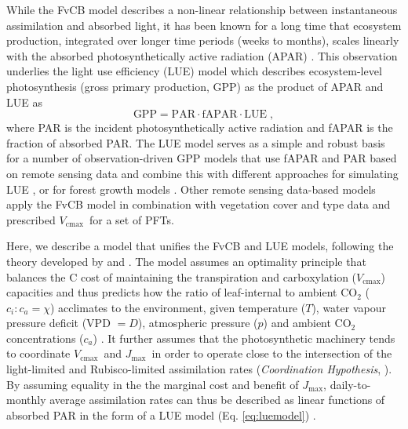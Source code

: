 \documentclass[gmd, manuscript]{copernicus}
\newcommand{\vcmax}{$V_{\text{cmax}}$}
\newcommand{\jmax}{$J_{\text{max}}$}
\begin{document}
While the FvCB model describes a non-linear relationship between instantaneous assimilation and absorbed light, it has been known for a long time that ecosystem production, integrated over longer time periods (weeks to months), scales linearly with the absorbed photosynthetically active radiation (APAR) \citep{monteith72, medlyn98}. This observation underlies the light use efficiency (LUE) model which describes ecosystem-level photosynthesis (gross primary production, GPP) as the product of APAR and LUE as
\begin{equation}
\label{eq:luemodel}
\text{GPP} = \text{PAR} \cdot \text{fAPAR} \cdot \text{LUE} \;,
\end{equation}
where PAR is the incident photosynthetically active radiation and fAPAR is the fraction of absorbed PAR. The LUE model serves as a simple and robust basis for a number of observation-driven GPP models that use fAPAR and PAR based on remote sensing data and combine this with different approaches for simulating LUE \citep{running04, Zhang2017-yr, field95rse}, or for forest growth models \citep{landsberg97fem}. Other remote sensing data-based models \citep{jiang16rse} apply the FvCB model in combination with vegetation cover and type data and prescribed \vcmax\ for a set of PFTs.

Here, we describe a model that unifies the FvCB and LUE models, following the theory developed by \citet{prentice14ecollett} and \citet{wang17natpl}. The model assumes an optimality principle that balances the C cost of maintaining the transpiration and carboxylation (\vcmax ) capacities and thus predicts how the ratio of leaf-internal to ambient CO$_2$ ($c_i:c_a = \chi$) acclimates to the environment, given temperature ($T$), water vapour pressure deficit (VPD $= D$), atmospheric pressure ($p$) and ambient CO$_2$ concentrations ($c_a$)  \citep{prentice14ecollett}. It further assumes that the photosynthetic machinery tends to coordinate \vcmax\ and \jmax\ in order to operate close to the intersection of the light-limited and Rubisco-limited assimilation rates (\textit{Coordination Hypothesis}, \citet{chen93, maire12po}). %
By assuming equality in the the marginal cost and benefit of \jmax , daily-to-monthly average assimilation rates can thus be described as linear functions of absorbed PAR in the form of a LUE model (Eq. \ref{eq:luemodel}) \citep{wang17natpl}.  
\end{document}
